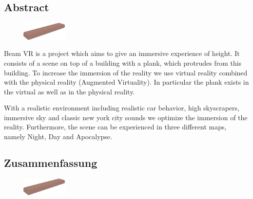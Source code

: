 \begin{spacing}{1}

    \chapter*{Abstract}

\end{spacing}

\begin{figure}

    \begin{center}

        \includegraphics[width=0.2\textwidth]{pics/abstract_picture_1}

    \end{center}

\end{figure}

Beam VR is a project which aims to give an immersive experience of height.
It consists of a scene on top of a building with a plank, which protrudes from this building.
To increase the immersion of the reality we use virtual reality combined with the physical reality (Augmented Virtuality).
In particular the plank exists in the virtual as well as in the physical reality.

With a realistic environment including realistic car behavior, high skyscrapers, immersive sky and classic new york city sounds we optimize the immersion of the reality.
Furthermore, the scene can be experienced in three different maps, namely Night, Day and Apocalypse.

\newpage

\begin{spacing}{1}

    \chapter*{Zusammenfassung}

\end{spacing}

\begin{figure}

    \begin{center}

        \includegraphics[width=0.2\textwidth]{pics/abstract_picture_1}

    \end{center}

\end{figure}

